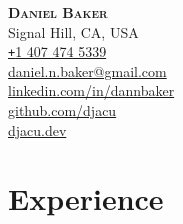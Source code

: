 \documentclass[letterpaper,11pt]{article}
\begin{document}

\begin{flushleft}
    \textbf{\Huge \scshape Daniel Baker} \vspace{0.5em} \\
    \small
    Signal Hill, CA, USA \\
    \href{tel:14074745339}{\texttt{+}1 407 474 5339} \\
    \href{mailto:daniel.n.baker@gmail.com}{daniel.n.baker@gmail.com} \\
    \href{https://www.linkedin.com/in/dannbaker/}{linkedin.com/in/dannbaker} \\
    \href{https://github.com/djacu}{github.com/djacu} \\
    \href{https://djacu.dev/}{djacu.dev}
\end{flushleft}


\section{Experience}
\end{document}
